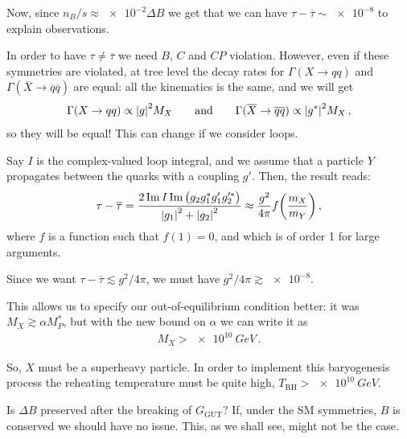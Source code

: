 \documentclass[main.tex]{subfiles}
\begin{document}

Now, since \(n_B / s \approx \num{e-2} \Delta B\) we get that we can have \(\tau - \overline{\tau} \sim \num{e-8}\) to explain observations. 

In order to have \(\tau \neq \overline{\tau}\) we need \(B\), \(C\) and \(CP\) violation. 
However, even if these symmetries are violated, at tree level the decay rates for \(\Gamma (X \to qq)\) and \(\Gamma (\overline{X} \to \overline{q} \overline{q})\) are equal: all the kinematics is the same, and we will get 
%
\begin{align}
\Gamma (X \to qq) \propto \abs{g}^2 M_X
\qquad \text{and} \qquad
\Gamma (\overline{X} \to \overline{q} \overline{q}) \propto \abs{g^{*}}^2 M_X
\,,
\end{align}
%
so they will be equal! 
This can change if we consider loops. 

\begin{claim}
Say \(I\) is the complex-valued loop integral, and we assume that a particle \(Y\) propagates between the quarks with a coupling \(g'\).
Then, the result reads:
%
\begin{align}
\tau - \overline{\tau} = \frac{2 \Im I \Im \qty(g_2 g_1^{*} g_1' g^{\prime *}_2)}{\abs{g_1 }^2 + \abs{g_2 }^2}
\approx \frac{g^2}{4 \pi } f \qty( \frac{m_X}{m_Y})
\,,
\end{align}
%
where \(f\) is a function such that \(f(1) = 0\), and which is of order 1 for large arguments. 
\end{claim}

Since we want \(\tau - \overline{\tau} \lesssim g^2 / 4 \pi \), we must have \(g^2 / 4 \pi \gtrsim \num{e-8}\). 

This allows us to specify our out-of-equilibrium condition better: it was \(M_X \gtrsim \alpha M_P^{*}\), but with the new bound on \(\alpha \) we can write it as 
%
\begin{align}
M_X > \SI{e10}{GeV}
\,.
\end{align}

So, \(X\) must be a superheavy particle.
In order to implement this baryogenesis process the reheating temperature must be quite high, \(T _{\text{RH}} > \SI{e10}{GeV}\).

Is \(\Delta B\) preserved after the breaking of \(G _{\text{GUT}}\)? If, under the SM symmetries, \(B\) is conserved we should have no issue. 
This, as we shall see, might not be the case. 

\end{document}
